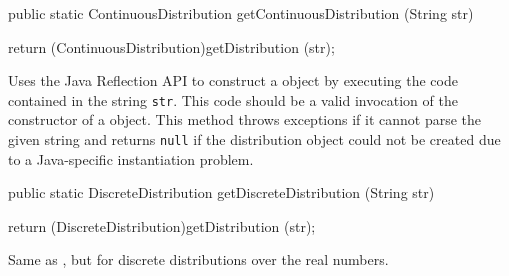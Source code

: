 \begin{code}

   public static ContinuousDistribution getContinuousDistribution (String str)\begin{hide} {
      return (ContinuousDistribution)getDistribution (str);
   }\end{hide}
\end{code}
\begin{tabb}  
  Uses the Java Reflection API to construct a 
  object by executing the code contained in the string \texttt{str}.
  This code should be a valid invocation of the constructor of a 
   object.
  This method throws exceptions if it cannot parse the given string and 
  returns \texttt{null} if the distribution object could not be created due to 
  a Java-specific instantiation problem.
\end{tabb}
\begin{htmlonly}
\end{htmlonly}
\begin{code}

   public static DiscreteDistribution getDiscreteDistribution (String str)\begin{hide} {
      return (DiscreteDistribution)getDistribution (str);
   }
\end{hide}
\end{code}
\begin{tabb}  
  Same as , but for discrete distributions
  over the real numbers.
\end{tabb}
\begin{htmlonly}
\end{htmlonly}
